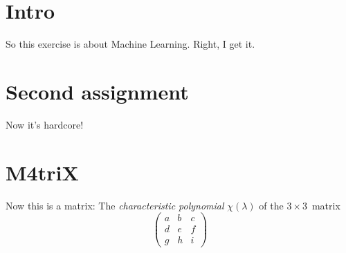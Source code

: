 
\section{Intro}

So this exercise is about Machine Learning. Right, I get it.


\section{Second assignment}

Now it's hardcore! \citep{esimerkki2011}


\section{M4triX}


Now this is a matrix:
The \emph{characteristic polynomial} $\chi(\lambda)$ of the
$3 \times 3$~matrix
\[ \left( \begin{array}{ccc}
a & b & c \\
d & e & f \\
g & h & i \end{array} \right)\] 



